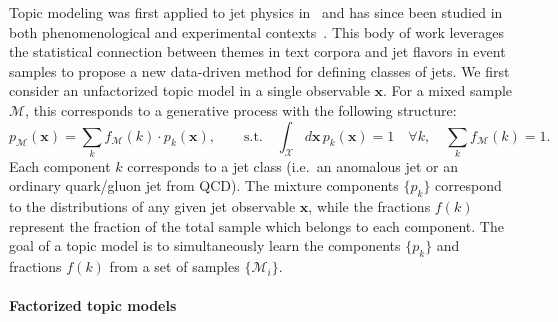 \documentclass[a4paper,11pt]{article}
\newcommand{\bbm}[1]{\mathbf{#1}}
\newcommand{\bv}[1]{\bbm{#1}}
\begin{document}
Topic modeling was first applied to jet physics in~\cite{Metodiev:2018ftz} and has since been studied in both phenomenological and experimental contexts~\cite{Komiske:2018vkc,Aad:2019onw,Sirunyan:2019jud,Aad:2020cws}.
This body of work leverages the statistical connection between themes in text corpora and jet flavors in event samples to propose a new data-driven method for defining classes of jets.
We first consider an unfactorized topic model in a single observable $\bv{x}$.
For a mixed sample $\mathcal{M}$, this corresponds to a generative process with the following structure:
\begin{equation}
\label{prob:topic_model}
	p_{\mathcal{M}}(\bv{x}) = \sum_{k} f_{\mathcal{M}}(k) \cdot p_{k}(\bv{x}), \qquad \text{s.t.} \quad \int_\mathcal{X} d\bv{x} \, p_k(\bv{x}) = 1 \quad \forall k, \quad \sum_{k} f_\mathcal{M}(k) = 1.
\end{equation}
Each component $k$ corresponds to a jet class (i.e.~an anomalous jet or an ordinary quark/gluon jet from QCD).
The mixture components $\{p_k\}$ correspond to the distributions of any given jet observable $\bv{x}$, while the fractions $f(k)$ represent the fraction of the total sample which belongs to each component.
The goal of a topic model is to simultaneously learn the components $\{p_k\}$ and fractions $f(k)$ from a set of samples $\{\mathcal{M}_i\}$.

\paragraph{Factorized topic models}
\label{subsec:formulation}
\end{document}
